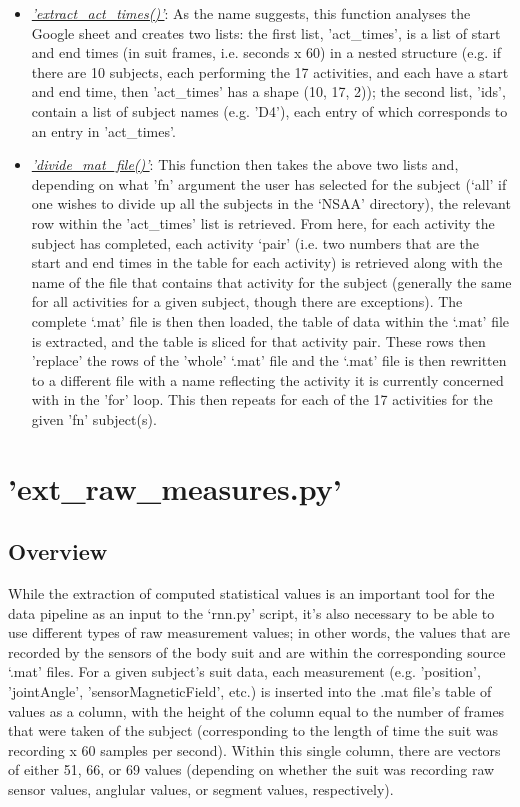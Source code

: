 \documentclass[12pt,twoside]{report}
\begin{document}
\begin{itemize}
	\item \underline{\textit{'extract\_act\_times()'}}: As the name suggests, this function analyses the Google sheet and creates two lists: the first list, 'act\_times', is a list of start and end times (in suit frames, i.e. seconds x 60) in a nested structure (e.g. if there are 10 subjects, each performing the 17 activities, and each have a start and end time, then 'act\_times' has a shape (10, 17, 2)); the second list, 'ids', contain a list of subject names (e.g. 'D4'), each entry of which corresponds to an entry in 'act\_times'.
	\item \underline{\textit{'divide\_mat\_file()'}}: This function then takes the above two lists and, depending on what 'fn' argument the user has selected for the subject (‘all’ if one wishes to divide up all the subjects in the ‘NSAA’ directory), the relevant row within the 'act\_times' list is retrieved. From here, for each activity the subject has completed, each activity ‘pair’ (i.e. two numbers that are the start and end times in the table for each activity) is retrieved along with the name of the file that contains that activity for the subject (generally the same for all activities for a given subject, though there are exceptions). The complete ‘.mat’ file is then then loaded, the table of data within the ‘.mat’ file is extracted, and the table is sliced for that activity pair. These rows then 'replace' the rows of the 'whole' ‘.mat’ file and the ‘.mat’ file is then rewritten to a different file with a name reflecting the activity it is currently concerned with in the 'for' loop. This then repeats for each of the 17 activities for the given 'fn' subject(s).
\end{itemize}



\section{'ext\_raw\_measures.py'}

\subsection{Overview}

\quad While the extraction of computed statistical values is an important tool for the data pipeline as an input to the ‘rnn.py’ script, it's also necessary to be able to use different types of raw measurement values; in other words, the values that are recorded by the sensors of the body suit and are within the corresponding source ‘.mat’ files. For a given subject's suit data, each measurement (e.g. 'position', 'jointAngle', 'sensorMagneticField', etc.) is inserted into the .mat file's table of values as a column, with the height of the column equal to the number of frames that were taken of the subject (corresponding to the length of time the suit was recording x 60 samples per second). Within this single column, there are vectors of either 51, 66, or 69 values (depending on whether the suit was recording raw sensor values, anglular values, or segment values, respectively).\\
\end{document}
